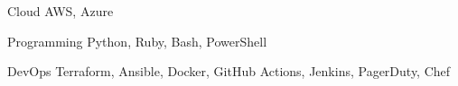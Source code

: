 


\begin{cvskills}


\cvskill
{Cloud} %
{AWS, Azure} %


\cvskill
{Programming} %
{Python, Ruby, Bash, PowerShell} %


\cvskill
{DevOps} %
{Terraform, Ansible, Docker, GitHub Actions, Jenkins, PagerDuty, Chef} %


\end{cvskills}

